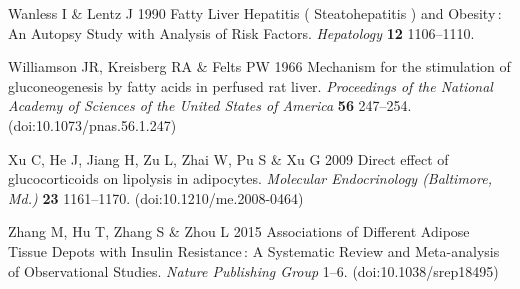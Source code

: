 \documentclass[11pt]{article} %
\begin{document}
Wanless I \& Lentz J 1990 Fatty Liver Hepatitis ( Steatohepatitis ) and
Obesity : An Autopsy Study with Analysis of Risk Factors.
\emph{Hepatology} \textbf{12} 1106--1110.

Williamson JR, Kreisberg RA \& Felts PW 1966 Mechanism for the
stimulation of gluconeogenesis by fatty acids in perfused rat liver.
\emph{Proceedings of the National Academy of Sciences of the United
States of America} \textbf{56} 247--254. (doi:10.1073/pnas.56.1.247)

Xu C, He J, Jiang H, Zu L, Zhai W, Pu S \& Xu G 2009 Direct effect of
glucocorticoids on lipolysis in adipocytes. \emph{Molecular
Endocrinology (Baltimore, Md.)} \textbf{23} 1161--1170.
(doi:10.1210/me.2008-0464)

Zhang M, Hu T, Zhang S \& Zhou L 2015 Associations of Different Adipose
Tissue Depots with Insulin Resistance : A Systematic Review and
Meta-analysis of Observational Studies. \emph{Nature Publishing Group}
1--6. (doi:10.1038/srep18495)
\end{document}
